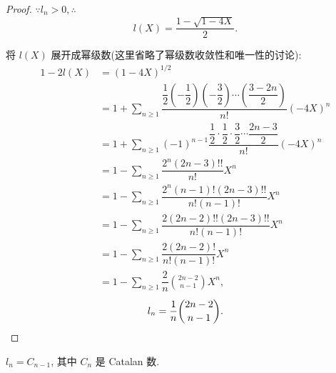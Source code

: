 \documentclass[color=black,device=normal,lang=cn,mode=geye]{elegantnote}
\begin{document}
\begin{proof}
    $\because l_n>0,\therefore$
    \[l(X)=\dfrac{1-\sqrt{1-4X}}{2}.\]

    将 $l(X)$ 展开成幂级数(这里省略了幂级数收敛性和唯一性的讨论):
    \begin{align*}
        1-2l(X) & =(1-4X)^{1/2} \\
        & =1+\sum\limits_{n\geq1}\dfrac{\dfrac{1}{2}\left(-\dfrac{1}{2}\right)\left(-\dfrac{3}{2}\right)\cdots\left(\dfrac{3-2n}{2}\right)}{n!}(-4X)^n \\
        & =1+\sum\limits_{n\geq1}(-1)^{n-1}\dfrac{\dfrac{1}{2}\cdot\dfrac{1}{2}\cdot\dfrac{3}{2}\cdots\dfrac{2n-3}{2}}{n!}(-4X)^n \\
        & =1-\sum\limits_{n\geq1}\dfrac{2^n(2n-3)!!}{n!}X^n \\
        & =1-\sum\limits_{n\geq1}\dfrac{2^n(n-1)!(2n-3)!!}{n!(n-1)!}X^n \\
        & =1-\sum\limits_{n\geq1}\dfrac{2(2n-2)!!(2n-3)!!}{n!(n-1)!}X^n \\
        & =1-\sum\limits_{n\geq1}\dfrac{2(2n-2)!}{n!(n-1)!}X^n \\
        & =1-\sum\limits_{n\geq1}\dfrac{2}{n}\binom{2n-2}{n-1}X^n,
    \end{align*}
    \[l_n=\dfrac{1}{n}\binom{2n-2}{n-1}.\qedhere\]
\end{proof}
\begin{note}
    $l_n=C_{n-1}$, 其中 $C_n$ 是 Catalan 数.
\end{note}
\end{document}
